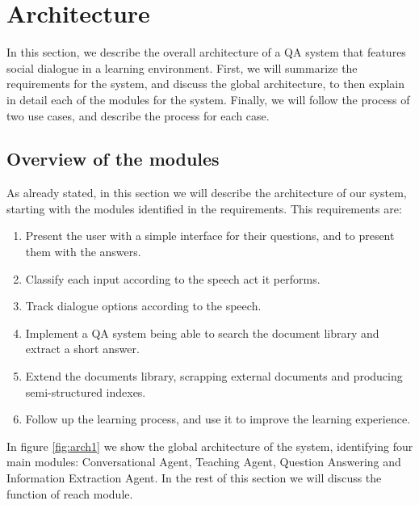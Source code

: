 \chapter{Architecture}
\label{chap:architecture}

\begin{chapterintro}

In this section, we describe the overall architecture of a QA system that features social dialogue in a learning environment. First, we will summarize the requirements for the system, and discuss the global architecture, to then explain in detail each of the modules for the system. Finally, we will follow the process of two use cases, and describe the process for each case.
 
\end{chapterintro}

\cleardoublepage

\section{Overview of the modules}

As already stated, in this section we will describe the architecture of our system, starting with the modules identified in the requirements. This requirements are:
\begin{enumerate}[noitemsep, label=(\roman*)]
 \item Present the user with a simple interface for their questions, and to present them with the answers.
 \item Classify each input according to the speech act it performs.
 \item Track dialogue options according to the speech.
 \item Implement a QA system being able to search the document library and extract a short answer.
 \item Extend the documents library, scrapping external documents and producing semi-structured indexes.
 \item Follow up the learning process, and use it to improve the learning experience. 
\end{enumerate}

In figure \ref{fig:arch1} we show the global architecture of the system, identifying four main modules: Conversational Agent, Teaching Agent, Question Answering and Information Extraction Agent. In the rest of this section we will discuss the function of reach module.

